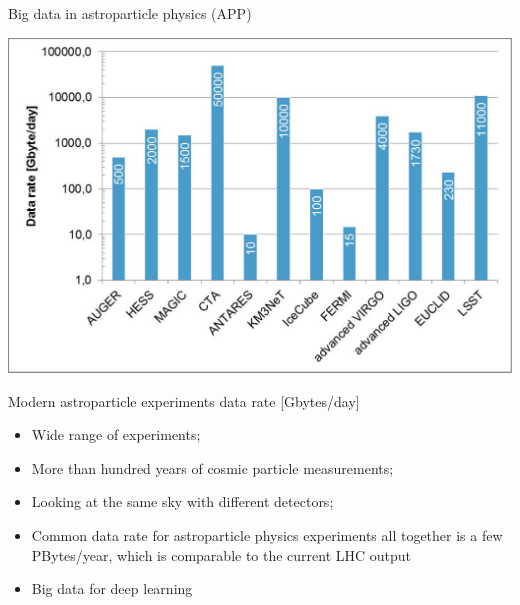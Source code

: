 \begin{frame}{Big data in astroparticle physics (APP)}
    \small
    \begin{minipage}[c]{0.58\textwidth}
        \begin{center}
            \includegraphics[width=1\textwidth]{pics/appec_computing-diagram.pdf}
        \end{center}
        \vspace{-2\parsep}
        \small Modern astroparticle experiments data rate [Gbytes/day]\footnotemark[1] %
    \end{minipage}
    \hfill
    \begin{minipage}[c]{0.41\textwidth}
        \begin{itemize}
            \setlength{\itemsep}{0pt}
            \item Wide range of experiments;
            \item More than hundred years of cosmic particle measurements;
            \item Looking at the same sky with different detectors;
            \item Common data rate for astroparticle physics experiments all together is a few PBytes/year, which is comparable to the current LHC output\footnotemark[1]
            \item Big data for deep learning
        \end{itemize}
    \end{minipage}
    \footnotesize{}
\end{frame}

